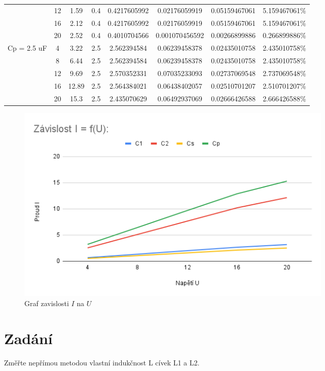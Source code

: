 \documentclass[a4paper]{article}
\begin{document}
\begin{longtable}{c|c|c|c|c|c|c|c}
	& 12   & 1.59  & 0.4                 & 0.4217605992 & 0.02176059919  & 0.05159467061&5.159467061\%   \\
	& 16   & 2.12  & 0.4                 & 0.4217605992 & 0.02176059919  & 0.05159467061&5.159467061\%   \\
	& 20   & 2.52  & 0.4                 & 0.4010704566 & 0.001070456592 & 0.00266899886&0.266899886\%   \\
	\newpage \hline
	Cp = 2.5 uF & 4    & 3.22  & 2.5                 & 2.562394584  & 0.06239458378  & 0.02435010758&2.435010758\%   \\
	& 8    & 6.44  & 2.5                 & 2.562394584  & 0.06239458378  & 0.02435010758&2.435010758\%   \\
	& 12   & 9.69  & 2.5                 & 2.570352331  & 0.07035233093  & 0.02737069548&2.737069548\%   \\
	& 16   & 12.89 & 2.5                 & 2.564384021  & 0.06438402057  & 0.02510701207&2.510701207\%   \\
	& 20   & 15.3  & 2.5                 & 2.435070629  & 0.06492937069  & 0.02666426588&2.666426588\%   \\
\end{longtable}

\begin{figure}[H]
	\centering
	\includegraphics[width=0.75\textwidth]{I_U.png}
	\caption{Graf zavislosti $I$ na $U$}
	\label{fig:mesh1}
\end{figure}

\section*{Zadání}
Změřte nepřímou metodou vlastní indukčnost L cívek L1 a L2.
\end{document}

